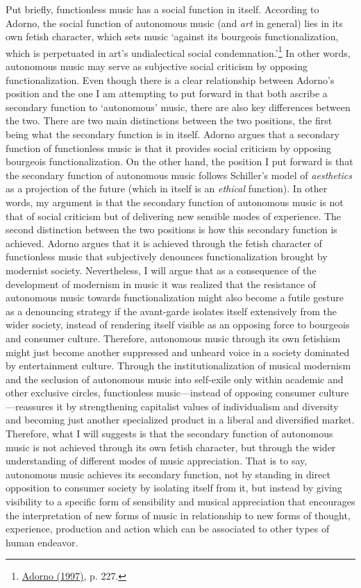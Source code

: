 Put briefly, functionless music has a social function in itself. According to Adorno, the social function of autonomous music (and \emph{art} in general) lies in its own fetish character, which sets music `against its bourgeois functionalization, which is perpetuated in art's undialectical social condemnation.'\footnote{\hyperlink{adornoaesth}{Adorno (1997)}, p. 227.} In other words, autonomous music may serve as subjective social criticism by opposing functionalization. Even though there is a clear relationship between Adorno's position and the one I am attempting to put forward in that both ascribe a secondary function to `autonomous' music, there are also key differences between the two. There are two main distinctions between the two positions, the first being what the secondary function is in itself. Adorno argues that a secondary function of functionless music is that it provides social criticism by opposing bourgeois functionalization. On the other hand, the position I put forward is that the secondary function of autonomous music follows Schiller's model of \emph{aesthetics} as a projection of the future (which in itself is an \emph{ethical} function). In other words, my argument is that the secondary function of autonomous music is not that of social criticism but of delivering new sensible modes of experience. The second distinction between the two positions is how this secondary function is achieved. Adorno argues that it is achieved through the fetish character of functionless music that subjectively denounces functionalization brought by modernist society. Nevertheless, I will argue that as a consequence of the development of modernism in music it was realized that the resistance of autonomous music towards functionalization might also become a futile gesture as a denouncing strategy if the avant-garde isolates itself extensively from the wider society, instead of rendering itself visible as an opposing force to bourgeois and consumer culture. Therefore, autonomous music through its own fetishism might just become another suppressed and unheard voice in a society dominated by entertainment culture. Through the institutionalization of musical modernism and the seclusion of autonomous music into self-exile only within academic and other exclusive circles, functionless music---instead of opposing consumer culture---reassures it by strengthening capitalist values of individualism and diversity and becoming just another specialized product in a liberal and diversified market. Therefore, what I will suggests is that the secondary function of autonomous music is not achieved through its own fetish character, but through the wider understanding of different modes of music appreciation. That is to say, autonomous music achieves its secondary function, not by standing in direct opposition to consumer society by isolating itself from it, but instead by giving visibility to a specific form of sensibility and musical appreciation that encourages the interpretation of new forms of music in relationship to new forms of thought, experience, production and action which can be associated to other types of human endeavor.

